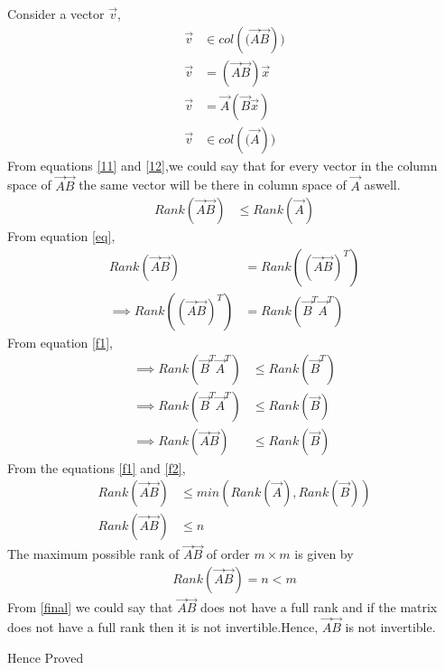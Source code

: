 \documentclass[journal,12pt,twocolumn]{IEEEtran}
\begin{document}
Consider a vector $\vec{v}$,
\begin{align}
\vec{v} &\in col(\mathbf(\vec{A}\vec{B}))\label{11}\\
\vec{v}&=(\vec{A}\vec{B})\vec{x}\\
\vec{v}&=\vec{A}(\vec{B}\vec{x})\\
\vec{v} &\in col(\mathbf(\vec{A}))\label{12}
\end{align}
From equations \eqref{11} and \eqref{12},we could say that for every vector in the column space of $\vec{A}\vec{B}$ the same vector will be there in column space of $\vec{A}$ aswell.
\begin{align}
    Rank(\vec{A}\vec{B})&\leq Rank(\vec{A})\label{f1}
\end{align}
From equation \eqref{eq},
\begin{align}
 Rank(\vec{A}\vec{B})&=Rank((\vec{A}\vec{B})^T)\\
\implies Rank((\vec{A}\vec{B})^T)&=Rank(\vec{B}^T\vec{A}^T)
\end{align}
From equation \eqref{f1},
\begin{align}
    \implies Rank(\vec{B}^T\vec{A}^T)&\leq Rank(\vec{B}^T)\\
\implies Rank(\vec{B}^T\vec{A}^T)&\leq Rank(\vec{B})\\
\implies Rank(\vec{A}\vec{B})&\leq Rank(\vec{B})\label{f2}
\end{align}
From the equations \eqref{f1} and \eqref{f2},
\begin{align}
    Rank(\vec{A}\vec{B})&\leq min(Rank(\vec{A}),Rank(\vec{B}))\\
    Rank(\vec{A}\vec{B})&\leq n
\end{align}
The maximum possible rank of $\vec{A}\vec{B}$ of order $m\times m$ is given by 
\begin{align}
    Rank(\vec{A}\vec{B})= n < m\label{final}
\end{align}
From \eqref{final} we could say that $\vec{A}\vec{B}$ does not have a full rank and if the matrix does not have a full rank then it is not invertible.Hence, $\vec{A}\vec{B}$ is not invertible.
\begin{center}
    Hence Proved
\end{center}
\end{document}
